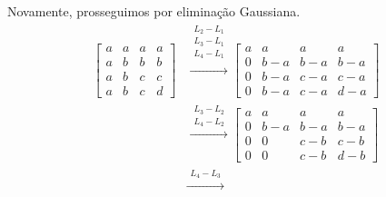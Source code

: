 \documentclass[leqno]{article}
\numberwithin{equation}{section}
\begin{document}
\begin{enumerate}
        \begin{sol} 
            Novamente, prosseguimos por eliminação Gaussiana.
            \begin{align*}
                \begin{bmatrix}
                    a & a & a & a  \\
                    a & b & b & b  \\
                    a & b & c & c  \\
                    a & b & c & d 
                \end{bmatrix}
                    &\xrightarrow{
                        \begin{array}{l}
                            L_{ 2 } - L_{ 1 } \\
                            L_{ 3 } - L_{ 1 } \\
                            L_{ 4 } - L_{ 1 } \\
                        \end{array}
                    }
                    \begin{bmatrix}
                        a & a & a & a  \\
                        0 & b - a & b - a & b - a  \\
                        0 & b - a & c - a & c - a  \\
                        0 & b - a & c - a & d - a 
                    \end{bmatrix} \\
                    &\xrightarrow{
                        \begin{array}{l}
                            L_{ 3 } - L_{ 2 } \\
                            L_{ 4 } - L_{ 2 }
                        \end{array}
                    }
                    \begin{bmatrix}
                        a & a & a & a  \\
                        0 & b - a & b - a & b - a  \\
                        0 & 0     & c - b & c - b  \\
                        0 & 0     & c - b & d - b 
                    \end{bmatrix} \\
                    &\xrightarrow{
                        \begin{array}{l}
                            L_{ 4 } - L_{ 3 }

\end{array}}
\end{align*}
\end{sol}
\end{enumerate}
\end{document}
